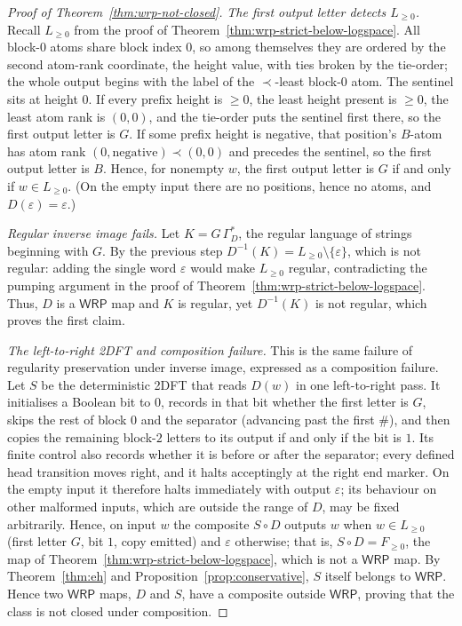 \documentclass[11pt]{article}
\theoremstyle{definition}
\newcommand{\WRP}{\mathsf{WRP}}
\begin{document}
\begin{proof}[Proof of Theorem~\ref{thm:wrp-not-closed}]
\vspace{0.5em}
\noindent\emph{The first output letter detects $L_{\ge 0}$.}
Recall $L_{\ge 0}$ from the proof of
Theorem~\ref{thm:wrp-strict-below-logspace}.  All block-$0$ atoms share block
index $0$, so among themselves they are ordered by the second atom-rank
coordinate, the height value, with ties broken by the tie-order; the whole output begins
with the label of the $\prec$-least block-$0$ atom.  The sentinel sits at height
$0$.  If every prefix height is $\ge 0$, the least height present is $\ge 0$,
the least atom rank is $(0,0)$, and the tie-order puts the sentinel first there, so
the first output letter is $G$.  If some prefix height is negative, that
position's $B$-atom has atom rank $(0,\text{negative})\prec(0,0)$ and precedes the
sentinel, so the first output letter is $B$.  Hence, for nonempty $w$, the
first output letter is
$G$ if and only if $w\in L_{\ge 0}$.  (On the empty input there are no
positions, hence no atoms, and $D(\varepsilon)=\varepsilon$.)

\vspace{0.5em}
\noindent\emph{Regular inverse image fails.}
Let $K=G\,\Gamma_D^*$, the regular language of strings beginning with $G$.  By the
previous step $D^{-1}(K)=L_{\ge 0}\setminus\{\varepsilon\}$, which is not
regular: adding the single word $\varepsilon$ would make $L_{\ge 0}$ regular,
contradicting the pumping
argument in the proof of Theorem~\ref{thm:wrp-strict-below-logspace}.  Thus, $D$
is a $\WRP$ map and $K$ is regular, yet $D^{-1}(K)$ is not regular,
which proves the first claim.

\vspace{0.5em}
\noindent\emph{The left-to-right 2DFT and composition failure.}
This is the same failure of regularity preservation under inverse image,
expressed as a composition failure.
Let $S$ be the deterministic 2DFT that reads $D(w)$ in one left-to-right pass.
It initialises a Boolean bit to $0$, records in that bit whether the first
letter is $G$, skips the rest of block $0$ and the separator (advancing past
the first $\#$), and then copies the remaining block-$2$ letters to its output
if and only if the bit is $1$.  Its finite control also records whether it is
before or after the separator; every defined head transition moves right, and
it halts acceptingly at the right end marker.  On the empty input it therefore
halts immediately with output $\varepsilon$; its behaviour on other malformed
inputs, which are outside the range of $D$, may be fixed arbitrarily.  Hence,
on input $w$ the composite $S\circ D$ outputs $w$ when $w\in L_{\ge 0}$ (first
letter $G$, bit $1$, copy emitted) and $\varepsilon$ otherwise; that is,
$S\circ D=F_{\ge 0}$, the map of
Theorem~\ref{thm:wrp-strict-below-logspace}, which is not a $\WRP$
map.  By Theorem~\ref{thm:eh} and
Proposition~\ref{prop:conservative}, $S$ itself belongs to $\WRP$.  Hence two
$\WRP$ maps, $D$ and $S$, have a composite outside $\WRP$, proving that the
class is not closed under composition.
\end{proof}
\end{document}

